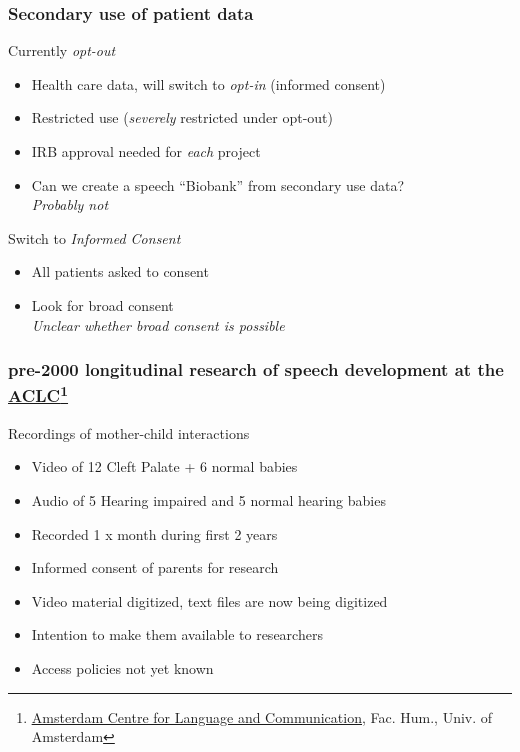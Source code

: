 \documentclass[xcolor=dvipsnames]{beamer}
\begin{document}
\begin{frame}
	\frametitle{Secondary use of patient data}
		
	\begin{block}{Currently {\em opt-out}}
	\begin{itemize}
	\item Health care data, will switch to {\em opt-in} (informed consent)
	\item Restricted use ({\em severely} restricted under opt-out) 
	\item IRB approval needed for {\color{Maroon} \em each} project
	\item Can we create a speech ``Biobank'' from secondary use data? \\
	{\em Probably not}
	\end{itemize}
	\end{block}	
	\begin{block}{Switch to {\em Informed Consent}}
	\begin{itemize}
	\item All patients asked to consent
	\item Look for broad consent \\
	{\em Unclear whether broad consent is possible}
	\end{itemize}
	\end{block}	
	
\end{frame}

\begin{frame}
	\frametitle{pre-2000 longitudinal research of speech development at the \href{http://aclc.uva.nl}{ACLC}\footnote[frame]{\scriptsize \href{http://aclc.uva.nl}{\underline{Amsterdam Centre for Language and Communication}}, Fac. Hum., Univ. of Amsterdam}}
		
	\begin{block}{Recordings of mother-child interactions}
	\begin{itemize}
	\item Video of 12 Cleft Palate + 6 normal babies {\scriptsize \cite{koopmans1986early}}
	\item Audio of 5 Hearing impaired and 5 normal hearing babies {\scriptsize \cite{clement1994development,vanderstelt2008deaf}}
	\item Recorded 1 x month during first 2 years 
	\item Informed consent of parents for research
	\item Video material digitized, text files are now being digitized
	\item Intention to make them available to researchers
	\item Access policies not yet known
	\end{itemize}
	\end{block}	
	
\end{frame}
\end{document}
